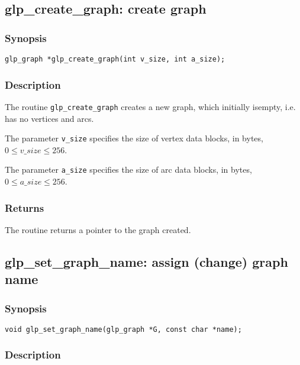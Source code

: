 \subsection{glp\_create\_graph: create graph}

\subsubsection*{Synopsis}

\begin{verbatim}
glp_graph *glp_create_graph(int v_size, int a_size);
\end{verbatim}

\subsubsection*{Description}

The routine \verb|glp_create_graph| creates a new graph, which
initially is\linebreak empty, i.e. has no vertices and arcs.

The parameter \verb|v_size| specifies the size of vertex data blocks,
in bytes, $0\leq v\_size\leq 256$.

The parameter \verb|a_size| specifies the size of arc data blocks, in
bytes, $0\leq a\_size\leq 256$.

\subsubsection*{Returns}

The routine returns a pointer to the graph created.

\subsection{glp\_set\_graph\_name: assign (change) graph name}

\subsubsection*{Synopsis}

\begin{verbatim}
void glp_set_graph_name(glp_graph *G, const char *name);
\end{verbatim}

\subsubsection*{Description}

